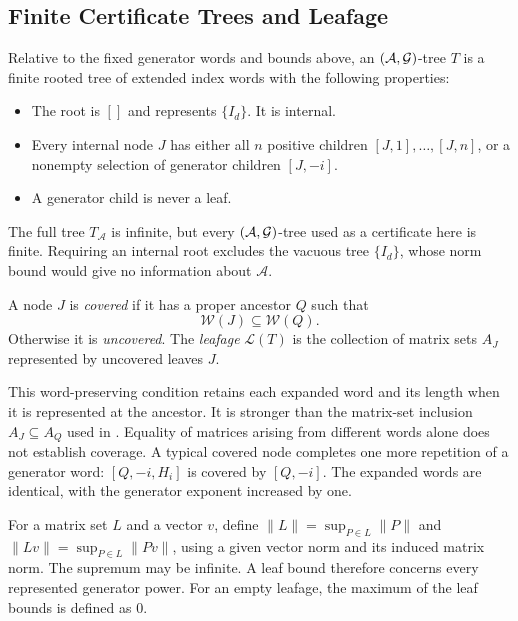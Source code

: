 \subsection{Finite Certificate Trees and Leafage}

\begin{definition}
    \label{def:agTree}
    Relative to the fixed generator words and bounds above, an $(\mathcal{A},\mathcal{G})$-tree $T$ is a finite rooted tree of extended index words with the following properties:
    \begin{itemize}
        \item The root is $[]$ and represents $\{I_d\}$.
        It is internal.
        \item Every internal node $J$ has either all $n$ positive children $[J,1],\dots,[J,n]$, or a nonempty selection of generator children $[J,-i]$.
        \item A generator child is never a leaf.
    \end{itemize}
\end{definition}

The full tree $T_{\mathcal{A}}$ is infinite, but every $(\mathcal{A},\mathcal{G})$-tree used as a certificate here is finite.
Requiring an internal root excludes the vacuous tree $\{I_d\}$, whose norm bound would give no information about $\mathcal{A}$.

\begin{definition}
    \label{def:coveredNode}
    A node $J$ is \emph{covered} if it has a proper ancestor $Q$ such that
    \[
        \mathcal{W}(J)\subseteq\mathcal{W}(Q).
    \]
    Otherwise it is \emph{uncovered}.
    The \emph{leafage} $\mathcal{L}(T)$ is the collection of matrix sets $A_J$ represented by uncovered leaves $J$.

    This word-preserving condition retains each expanded word and its length when it is represented at the ancestor.
    It is stronger than the matrix-set inclusion $A_J\subseteq A_Q$ used in \citet{MoellerReif2014TreeBasedJSR,MejstrikReif2025HybridApproachJSR}.
    Equality of matrices arising from different words alone does not establish coverage.
    A typical covered node completes one more repetition of a generator word: $[Q,-i,H_i]$ is covered by $[Q,-i]$.
    The expanded words are identical, with the generator exponent increased by one.
\end{definition}

For a matrix set $L$ and a vector $v$, define $\lVert L\rVert=\sup_{P\in L}\lVert P\rVert$ and $\lVert Lv\rVert=\sup_{P\in L}\lVert Pv\rVert$, using a given vector norm and its induced matrix norm.
The supremum may be infinite.
A leaf bound therefore concerns every represented generator power.
For an empty leafage, the maximum of the leaf bounds is defined as $0$.

